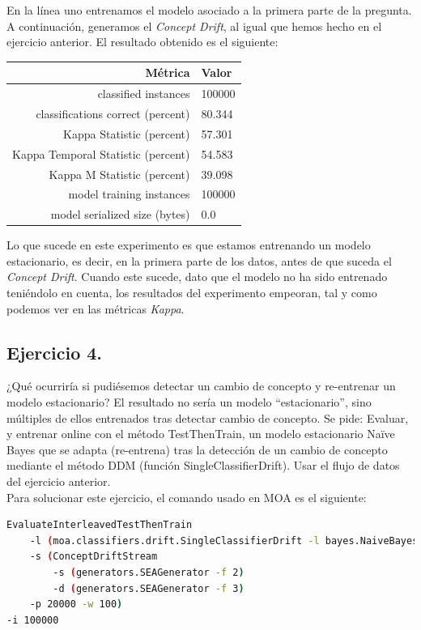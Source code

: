 \documentclass[11pt]{article}
\begin{document}
En la línea uno entrenamos el modelo asociado a la primera parte de la pregunta. A continuación, generamos el \textit{Concept Drift}, al igual que hemos hecho en el ejercicio anterior. El resultado obtenido es el siguiente:

\begin{table}[H]
	\centering
	\begin{tabular}{rl}
		\textbf{Métrica} & \textbf{Valor} \\ \hline
		classified instances & 100000 \\
		classifications correct (percent) & 80.344 \\
		Kappa Statistic (percent) & 57.301 \\
		Kappa Temporal Statistic (percent) & 54.583 \\
		Kappa M Statistic (percent) & 39.098 \\
		model training instances & 100000 \\
		model serialized size (bytes) & 0.0
	\end{tabular}
\end{table}

Lo que sucede en este experimento es que estamos entrenando un modelo estacionario, es decir, en la primera parte de los datos, antes de que suceda el \textit{Concept Drift}. Cuando este sucede, dato que el modelo no ha sido entrenado teniéndolo en cuenta, los resultados del experimento empeoran, tal y como podemos ver en las métricas \textit{Kappa}.

\subsection{Ejercicio 4.}

¿Qué ocurriría si pudiésemos detectar un cambio de concepto y re-entrenar un modelo estacionario? El resultado no sería un modelo ``estacionario'', sino múltiples de ellos entrenados tras detectar cambio de concepto. Se pide: Evaluar, y entrenar online con el método TestThenTrain, un modelo estacionario Na\"{i}ve Bayes que se adapta (re-entrena) tras la detección de un cambio de concepto mediante el método DDM (función SingleClassifierDrift). Usar el flujo de datos del ejercicio anterior. \\

Para solucionar este ejercicio, el comando usado en MOA es el siguiente:

\begin{lstlisting}[language=bash]
EvaluateInterleavedTestThenTrain 
	-l (moa.classifiers.drift.SingleClassifierDrift -l bayes.NaiveBayes -d DDM) 
	-s (ConceptDriftStream 
		-s (generators.SEAGenerator -f 2) 
		-d (generators.SEAGenerator -f 3) 
	-p 20000 -w 100) 
-i 100000
\end{lstlisting}
\end{document}
